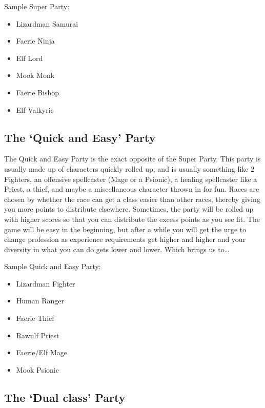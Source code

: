 \documentclass[12pt]{article}
\providecommand{\tightlist}{%
  \setlength{\itemsep}{0pt}\setlength{\parskip}{0pt}}
\begin{document}
Sample Super Party:

\begin{itemize}
\tightlist
\item
  Lizardman Samurai
\item
  Faerie Ninja
\item
  Elf Lord
\item
  Mook Monk
\item
  Faerie Bishop
\item
  Elf Valkyrie
\end{itemize}

\subsection{\texorpdfstring{The `Quick and Easy'
Party}{The Quick and Easy Party}}\label{the-quick-and-easy-party}

The Quick and Easy Party is the exact opposite of the Super Party. This
party is usually made up of characters quickly rolled up, and is usually
something like 2 Fighters, an offensive spellcaster (Mage or a Psionic),
a healing spellcaster like a Priest, a thief, and maybe a miscellaneous
character thrown in for fun. Races are chosen by whether the race can
get a class easier than other races, thereby giving you more points to
distribute elsewhere. Sometimes, the party will be rolled up with higher
scores so that you can distribute the excess points as you see fit. The
game will be easy in the beginning, but after a while you will get the
urge to change profession as experience requirements get higher and
higher and your diversity in what you can do gets lower and lower. Which
brings us to\ldots{}

Sample Quick and Easy Party:

\begin{itemize}
\tightlist
\item
  Lizardman Fighter
\item
  Human Ranger
\item
  Faerie Thief
\item
  Rawulf Priest
\item
  Faerie/Elf Mage
\item
  Mook Psionic
\end{itemize}

\subsection{\texorpdfstring{The `Dual class'
Party}{The Dual class Party}}\label{the-dual-class-party}
\end{document}
